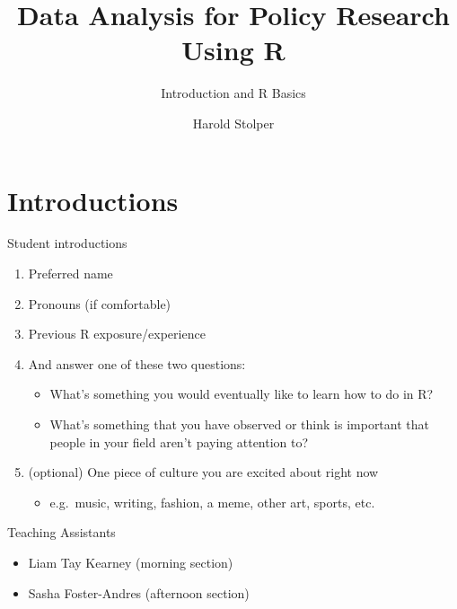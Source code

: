 \documentclass[
  8pt,
  ignorenonframetext,
  dvipsnames]{beamer}
\title{Data Analysis for Policy Research Using R}
\subtitle{Introduction and R Basics}
\author{Harold Stolper}
\date{}
\providecommand{\tightlist}{%
  \setlength{\itemsep}{0pt}\setlength{\parskip}{0pt}}
\let\olditem\item
\renewcommand{\item}{%
  \olditem\vspace{4pt}
}
\begin{document}
\frame{\titlepage}

\begin{frame}[allowframebreaks]
  \tableofcontents[hideallsubsections]
\end{frame}
\hypertarget{introductions}{%
\section{Introductions}\label{introductions}}

\begin{frame}{Student introductions}
\protect\hypertarget{student-introductions}{}
\begin{enumerate}
\tightlist
\item
  Preferred name
\item
  Pronouns (if comfortable)
\item
  Previous R exposure/experience
\item
  And answer one of these two questions:

  \begin{itemize}
  \tightlist
  \item
    What's something you would eventually like to learn how to do in R?
  \item
    What's something that you have observed or think is important that
    people in your field aren't paying attention to?
  \end{itemize}
\item
  (optional) One piece of culture you are excited about right now

  \begin{itemize}
  \tightlist
  \item
    e.g.~music, writing, fashion, a meme, other art, sports, etc.
  \end{itemize}
\end{enumerate}
\end{frame}

\begin{frame}{Teaching Assistants}
\protect\hypertarget{teaching-assistants}{}
\begin{itemize}
\tightlist
\item
  Liam Tay Kearney (morning section)
\item
  Sasha Foster-Andres (afternoon section)
\end{itemize}
\end{frame}
\end{document}
